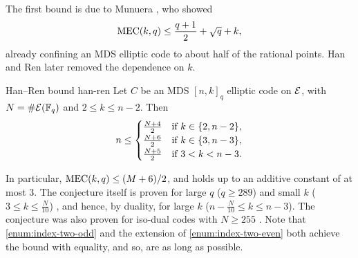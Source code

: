 \documentclass[twocolumn, 11pt]{scrartcl}
\begin{document}
The first bound is due to Munuera \cite{munuera1992main}, who showed
\[ \operatorname{MEC}(k,q)\leq\frac{q+1}{2}+\sqrt q+k, \]
already confining an MDS elliptic code to about half of the rational points. Han and Ren \cite{han2023tight,han2024maximal} later removed the dependence on $k$.

\begin{theorem}{Han--Ren bound \cite[Thm.~1.2]{han2024maximal}}{han-ren}
    Let $C$ be an MDS $[n,k]_q$ elliptic code on $\mathcal{E}$, with $N=\#\mathcal{E}(\mathbb{F}_q)$ and $2\leq k\leq n-2$. Then
    \[ n\leq\begin{cases}
        \frac{N+4}{2} & \text{if } k\in\{2,n-2\}, \\
        \frac{N+6}{2} & \text{if } k\in\{3,n-3\}, \\
        \frac{N+5}{2} & \text{if } 3<k<n-3.
    \end{cases} \]
\end{theorem}

In particular, $\operatorname{MEC}(k,q)\leq(M+6)/2$, and  holds up to an additive constant of at most 3. The conjecture itself is proven for large $q$ ($q\geq289$) and small $k$ ($3\leq k\leq \frac{N}{10}$) \cite{han2023tight}, and hence, by duality, for large $k$ ($n-\frac{N}{10}\leq k\leq n-3$). The conjecture was also proven for iso-dual codes with $N\geq255$ \cite[Thm.~3.1]{zhu2026isodual}. Note that \ref{enum:index-two-odd} and the extension of \ref{enum:index-two-even} both achieve the bound with equality, and so, are as long as possible.
\end{document}

